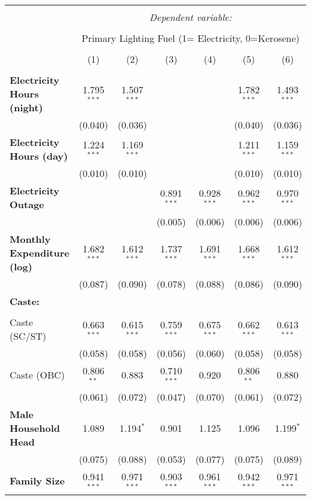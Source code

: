 
\begin{tabular}{@{\extracolsep{5pt}}lcccccc} 
\\[-1.8ex]\hline 
\hline \\[-1.8ex] 
 & \multicolumn{6}{c}{\textit{Dependent variable:}} \\ 
\cline{2-7} 
\\[-1.8ex] & \multicolumn{6}{c}{Primary Lighting Fuel (1= Electricity, 0=Kerosene)} \\ 
\\[-1.8ex] & (1) & (2) & (3) & (4) & (5) & (6)\\ 
\hline \\[-1.8ex] 
  \textbf{Electricity Hours (night)} & 1.795$^{***}$ & 1.507$^{***}$ &  &  & 1.782$^{***}$ & 1.493$^{***}$ \\ 
  & (0.040) & (0.036) &  &  & (0.040) & (0.036) \\ 
  \textbf{Electricity Hours (day)} & 1.224$^{***}$ & 1.169$^{***}$ &  &  & 1.211$^{***}$ & 1.159$^{***}$ \\ 
  & (0.010) & (0.010) &  &  & (0.010) & (0.010) \\ 
   \textbf{Electricity Outage} &  &  & 0.891$^{***}$ & 0.928$^{***}$ & 0.962$^{***}$ & 0.970$^{***}$ \\ 
  &  &  & (0.005) & (0.006) & (0.006) & (0.006) \\ 
   \textbf{Monthly Expenditure (log)} & 1.682$^{***}$ & 1.612$^{***}$ & 1.737$^{***}$ & 1.691$^{***}$ & 1.668$^{***}$ & 1.612$^{***}$ \\ 
  & (0.087) & (0.090) & (0.078) & (0.088) & (0.086) & (0.090) \\ 
   \textbf{Caste:}  &  &  &  &  &  &  \\ 
  &  &  &  &  &  &  \\ 
  Caste (SC/ST) & 0.663$^{***}$ & 0.615$^{***}$ & 0.759$^{***}$ & 0.675$^{***}$ & 0.662$^{***}$ & 0.613$^{***}$ \\ 
  & (0.058) & (0.058) & (0.056) & (0.060) & (0.058) & (0.058) \\ 
  Caste (OBC) & 0.806$^{**}$ & 0.883 & 0.710$^{***}$ & 0.920 & 0.806$^{**}$ & 0.880 \\ 
  & (0.061) & (0.072) & (0.047) & (0.070) & (0.061) & (0.072) \\ 
   \textbf{Male Household Head} & 1.089 & 1.194$^{*}$ & 0.901 & 1.125 & 1.096 & 1.199$^{*}$ \\ 
  & (0.075) & (0.088) & (0.053) & (0.077) & (0.075) & (0.089) \\ 
   \textbf{Family Size} & 0.941$^{***}$ & 0.971$^{***}$ & 0.903$^{***}$ & 0.961$^{***}$ & 0.942$^{***}$ & 0.971$^{***}$ \\ 

\end{tabular}
